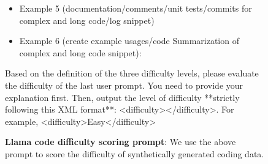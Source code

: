 \begin{figure}
\begin{framed}
\begin{itemize}
\item Example 5 (documentation/comments/unit tests/commits for complex and long code/log snippet)

\item Example 6 (create example usages/code Summarization of complex and long code snippet):
\end{itemize}

Based on the definition of the three difficulty levels, please evaluate the difficulty of the last user prompt. You need to provide your explanation first. Then, output the level of difficulty **strictly following this XML format**: <difficulty></difficulty>. For example, <difficulty>Easy</difficulty>

\end{framed}

  \caption{\textbf{Llama code difficulty scoring prompt}: We use the above prompt to score the difficulty of synthetically generated coding data.}
  \label{fig:llama_difficulty_coding_prompt}
\end{figure}



